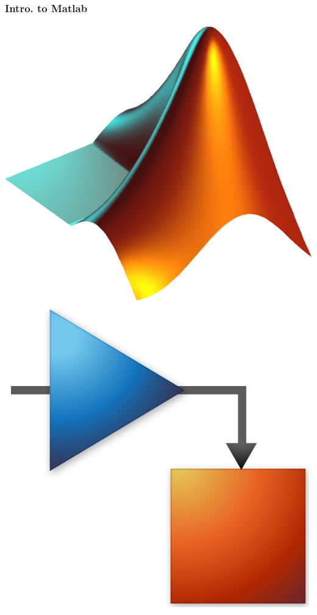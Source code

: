 \documentclass[hyperref={pdfpagelabels=true}]{beamer}
\begin{document}
\begin{frame}
\frametitle{Intro. to Matlab}
\begin{flushright}
\includegraphics[scale = 0.08]{figs/Selection_035.png}
\includegraphics[scale = 0.05]{figs/Selection_036.png}
\end{flushright}

\end{frame}
\end{document}
